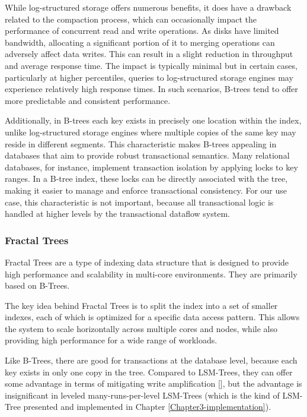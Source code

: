 While log-structured storage offers numerous benefits, it does have a drawback related to the compaction process, which can occasionally impact the performance of concurrent read and write operations. As disks have limited bandwidth, allocating a significant portion of it to merging operations can adversely affect data writes. This can result in a slight reduction in throughput and average response time. The impact is typically minimal but in certain cases, particularly at higher percentiles, queries to log-structured storage engines may experience relatively high response times. In such scenarios, B-trees tend to offer more predictable and consistent performance.

Additionally, in B-trees each key exists in precisely one location within the index, unlike log-structured storage engines where multiple copies of the same key may reside in different segments. This characteristic makes B-trees appealing in databases that aim to provide robust transactional semantics. Many relational databases, for instance, implement transaction isolation by applying locks to key ranges. In a B-tree index, these locks can be directly associated with the tree, making it easier to manage and enforce transactional consistency. For our use case, this characteristic is not important, because all transactional logic is handled at higher levels by the transactional dataflow system.

\subsubsection{Fractal Trees}

Fractal Trees are a type of indexing data structure that is designed to provide high performance and scalability in multi-core environments. They are primarily based on B-Trees.

The key idea behind Fractal Trees is to split the index into a set of smaller indexes, each of which is optimized for a specific data access pattern. This allows the system to scale horizontally across multiple cores and nodes, while also providing high performance for a wide range of workloads.

Like B-Trees, there are good for transactions at the database level, because each key exists in only one copy in the tree. Compared to LSM-Trees, they can offer some advantage in terms of mitigating write amplification [\cite{fractal-trees}], but the advantage is insignificant in leveled many-runs-per-level LSM-Trees (which is the kind of LSM-Tree presented and implemented in Chapter \ref{Chapter3-implementation}).


